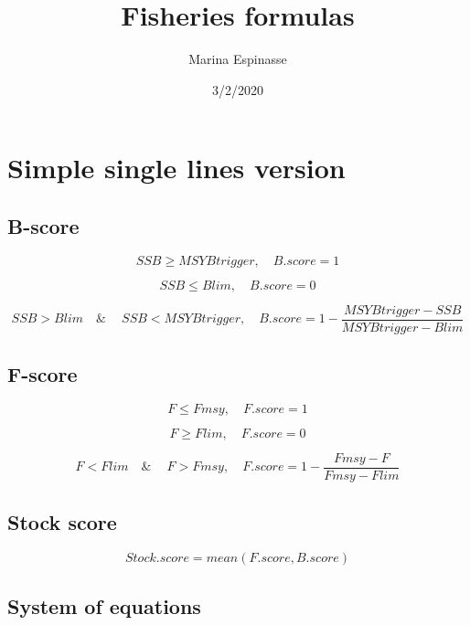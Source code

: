 \documentclass[
]{article}
\title{Fisheries formulas}
\author{Marina Espinasse}
\date{3/2/2020}
\begin{document}
\maketitle

\hypertarget{simple-single-lines-version}{%
\section{Simple single lines
version}\label{simple-single-lines-version}}

\hypertarget{b-score}{%
\subsection{B-score}\label{b-score}}

\[SSB\ge MSYBtrigger, \quad  B.score = 1\] \hspace{1cm}

\[SSB \le Blim, \quad  B.score = 0 \] \hspace{1cm}

\[SSB > Blim  \quad  \&\ \quad SSB < MSYBtrigger, \quad B.score = 1 - \frac{MSYBtrigger - SSB}{MSYBtrigger - Blim}\]
\hspace{1cm}

\hypertarget{f-score}{%
\subsection{F-score}\label{f-score}}

\[F \le Fmsy, \quad  F.score = 1\] \hspace{1cm}

\[F \ge Flim, \quad  F.score = 0\] \hspace{1cm}

\[F < Flim  \quad  \&\ \quad F > Fmsy, \quad F.score = 1 - \frac{Fmsy - F}{Fmsy - Flim}\]
\hspace{1cm}

\hypertarget{stock-score}{%
\subsection{Stock score}\label{stock-score}}

\[Stock.score = mean(F.score, B.score)\]

\hypertarget{system-of-equations}{%
\subsection{System of equations}\label{system-of-equations}}
\end{document}
